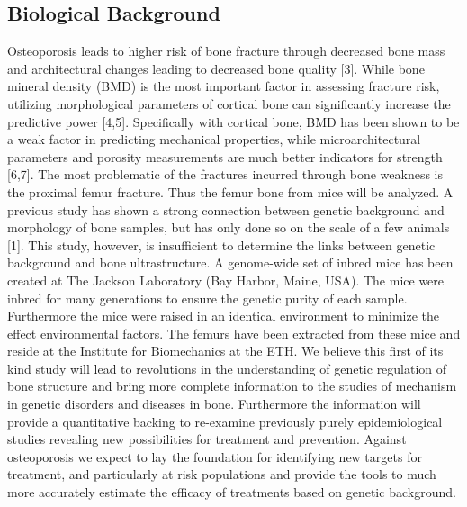 \documentclass[a4paper,10pt]{article}
\begin{document}
\subsection{Biological Background}
Osteoporosis leads to higher risk of bone fracture through decreased bone mass and architectural changes leading to decreased bone quality [3]. While bone mineral density (BMD) is the most important factor in assessing fracture risk, utilizing morphological parameters of cortical bone can significantly increase the predictive power [4,5]. Specifically with cortical bone, BMD has been shown to be a weak factor in predicting mechanical properties, while microarchitectural parameters and porosity measurements are much better indicators for strength [6,7]. The most problematic of the fractures incurred through bone weakness is the proximal femur fracture. Thus the femur bone from mice will be analyzed.
A previous study has shown a strong connection between genetic background and morphology of bone samples, but has only done so on the scale of a few animals [1]. This study, however, is insufficient to determine the links between genetic background and bone ultrastructure. A genome-wide set of inbred mice has been created at The Jackson Laboratory (Bay Harbor, Maine, USA). The mice were inbred for many generations to ensure the genetic purity of each sample. Furthermore the mice were raised in an identical environment to minimize the effect environmental factors. The femurs have been extracted from these mice and reside at the Institute for Biomechanics at the ETH.  
We believe this first of its kind study will lead to revolutions in the understanding of genetic regulation of bone structure and bring more complete information to the studies of mechanism in genetic disorders and diseases in bone. Furthermore the information will provide a quantitative backing to re-examine previously purely epidemiological studies revealing new possibilities for treatment and prevention. Against osteoporosis we expect to lay the foundation for identifying new targets for treatment, and particularly at risk populations and provide the tools to much more accurately estimate the efficacy of treatments based on genetic background.
\end{document}
